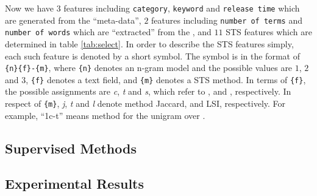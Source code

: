 Now we have $3$ features including \texttt{category}, \texttt{keyword} and \texttt{release time} which are generated from the ``meta-data'', $2$ features including \texttt{number of terms} and \texttt{number of words} which are ``extracted'' from the \icontent{}, and $11$ STS features which are determined in table \ref{tab:select}. In order to describe the STS features simply, each such feature is denoted by a short symbol. The symbol is in the format of \texttt{\{n\}\{f\}-\{m\}}, where \texttt{\{n\}} denotes an n-gram model and the possible values are $1$, $2$ and $3$, \texttt{\{f\}} denotes a text field, and \texttt{\{m\}} denotes a STS method. In terms of \texttt{\{f\}}, the possible assignments are \textit{c}, \textit{t} and \textit{s}, which refer to \icontent{}, \ititle{} and \isummary{}, respectively. In respect of \texttt{\{m\}}, \textit{j}, \textit{t} and \textit{l} denote method Jaccard, \tfidf{} and LSI, respectively. For example, ``1c-t'' means method \tfidf{} for the unigram over \icontent{}.


\subsection{Supervised Methods}
\label{sec:6.3}

\subsection{Experimental Results}
\label{sec:6.4}

